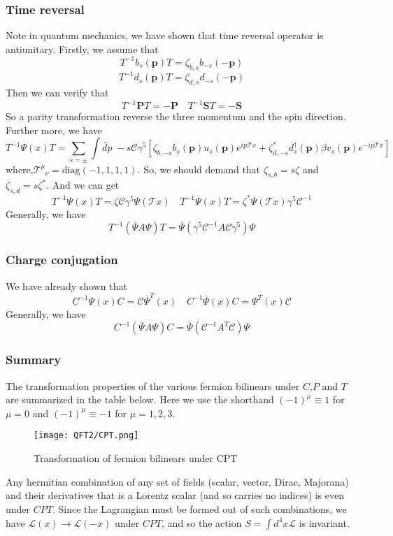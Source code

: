 \subsubsection{Time reversal}
Note in quantum mechanics, we have shown that time reversal operator is antiunitary. Firstly, we assume that
\[T^{-1} b_s(\bm{p}) T = \zeta_{b,s} b_{-s}(-\bm{p})\]
\[T^{-1} d_s(\bm{p}) T = \zeta_{d,s} d_{-s}(-\bm{p})\]
Then we can verify that
\[T^{-1} \bm{P} T = -\bm{P} \quad T^{-1} \bm{S} T = - \bm{S}\]
So a parity transformation reverse the three momentum and the spin direction. Further more, we have
\[T^{-1}\Psi(x)T = \sum_{s=\pm} \int \widetilde{dp} \: -s \mathcal{C} \gamma^5 \left [ \zeta_{b,-s} b_s(\bm{p}) u_s(\bm{p})e^{ip\mathcal{T}x} + \zeta_{d,-s}^* d^{\dagger}_s(\bm{p}) \beta v_s(\bm{p})e^{-ip\mathcal{T}x} \right ]\]
where,$\mathcal{T}^{\mu}_{\phantom{\mu}\nu} = \mathrm{diag}(-1,1,1,1)$. So, we should demand that $\zeta_{s,b} = s \zeta$ and $\zeta_{s,d} = s \zeta^*$. And we can get
\[T^{-1}\Psi(x)T = \zeta \mathcal{C} \gamma^5 \Psi(\mathcal{T}x) \quad T^{-1}\overline{\Psi}(x)T = \zeta^*  \overline{\Psi}(\mathcal{T}x)\gamma^5 \mathcal{C}^{-1} \]
Generally, we have
\[T^{-1} (\overline{\Psi} A \Psi) T = \overline{\Psi}(\gamma^5 \mathcal{C}^{-1} A \mathcal{C} \gamma^5)\Psi\]

\subsubsection{Charge conjugation}
\noindent
We have already shown that
\[C^{-1}\Psi(x)C = \mathcal{C} \overline{\Psi}^T(x) \quad C^{-1}\overline{\Psi}(x)C = \Psi^T(x)\mathcal{C}\]
Generally, we have
\[C^{-1}(\overline{\Psi} A \Psi )C = \overline{\Psi} (\mathcal{C}^{-1} A^T \mathcal{C})\Psi\]

\subsubsection{Summary}
The transformation properties of the various fermion bilinears under $C$,$P$ and $T$ are summarized in the table below. Here we use the shorthand $(-1)^{\mu} \equiv 1$ for $\mu =0$ and $(-1)^{\mu} \equiv  -1$ for $\mu=1,2,3$.

\begin{figure}[!h]
\centering
\texttt{[image: QFT2/CPT.png]}
\caption{Transformation of fermion bilinears under CPT}
\end{figure}

\begin{newthem}
Any hermitian combination of any set of fields (scalar, vector, Dirac, Majorana) and their derivatives that is a Lorentz scalar (and so carries no indices) is even under $CPT$. Since the Lagrangian must be formed out of such combinations, we
have $\mathcal{L}(x) \to \mathcal{L}(-x)$ under $CPT$, and so the action $S = \int d^4x \mathcal{L}$ is invariant.
\end{newthem}

